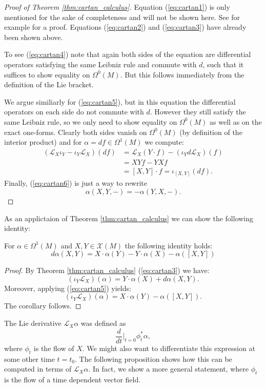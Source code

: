 \begin{proof}[Proof of Theorem \ref{thm:cartan_calculus}]
    Equation (\ref{eq:cartan1}) is only mentioned for the sake of completeness and will not be shown here. See for example \cite{steimle_geometrie} for a proof. Equations (\ref{eq:cartan2}) and (\ref{eq:cartan3}) have already been shown above. 
    
    To see (\ref{eq:cartan4}) note that again both sides of the equation are differential operators satisfying the same Leibniz rule and commute with $d$, such that it suffices to show equality on $\Omega^0(M)$. But this follows immediately from the definition of the Lie bracket.

    We argue similiarly for (\ref{eq:cartan5}), but in this equation the differential operators on each side do not commute with $d$. However they still satisfy the same Leibniz rule, so we only need to show equality on $\Omega^0(M)$ as well as on the exact one-forms. Clearly both sides vanish on $\Omega^0(M)$ (by definition of the interior product) and for $\alpha = df \in \Omega^1(M)$ we compute:
    \begin{align*}
        (\mathcal{L}_X\iota_Y - \iota_Y\mathcal{L}_X)(df) & = \mathcal{L}_X(Y \cdot f) - (\iota_Y d \mathcal{L}_X)(f) \\
        &= XYf - YXf\\
        &= [X,Y] \cdot f = \iota_{[X,Y]}(df).
    \end{align*}
    Finally, (\ref{eq:cartan6}) is just a way to rewrite
    \[
    \alpha(X,Y,-) = -\alpha(Y,X,-).
    \]
\end{proof}

As an applictaion of Theorem \ref{thm:cartan_calculus} we can show the following identity:

\begin{corollary}
    For $\alpha \in \Omega^1(M)$ and $X,Y \in \mathscr{X}(M)$ the following identity holds:
    \[
    d\alpha(X,Y) = X \cdot \alpha(Y) - Y \cdot \alpha(X) - \alpha([X,Y])
    \]
\end{corollary}
\begin{proof}
    By Theorem \ref{thm:cartan_calculus} (\ref{eq:cartan3}) we have:
    \[
    (\iota_Y\mathcal{L}_X)(\alpha) = Y \cdot \alpha(X) + d\alpha(X,Y).
    \]
    Moreover, applying (\ref{eq:cartan5}) yields:
    \[
    (\iota_Y\mathcal{L}_X)(\alpha) = X \cdot \alpha(Y) - \alpha([X,Y]).
    \]
    The corollary follows.
\end{proof}

The Lie derivative $\mathcal{L}_X\alpha$ was defined as
\[
\frac{d}{dt}\bigg|_{t=0}\phi_t^\ast\alpha,
\]
where $\phi_t$ is the flow of $X$. We might also want to differentiate this expression at some other time $t=t_0$. The following proposition shows how this can be computed in terms of $\mathcal{L}_X\alpha$. In fact, we show a more general statement, where $\phi_t$ is the flow of a time dependent vector field.

